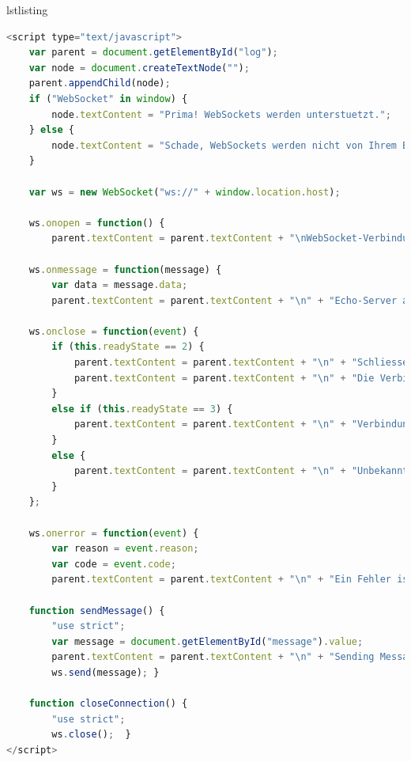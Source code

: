 \documentclass[a4paper, justified, notoc]{tufte-handout} %
\makeatletter
\newenvironment{listing}[1][htbp] %
  {\ifvmode\else\unskip\fi\begin{@tufte@float}[#1]{lstlisting}{}}
  {\end{@tufte@float} } %
\makeatother
\begin{document}
\begin{listing} %
\begin{lstlisting}[language=JavaScript]
<script type="text/javascript">
    var parent = document.getElementById("log");
    var node = document.createTextNode("");
    parent.appendChild(node);
    if ("WebSocket" in window) {
        node.textContent = "Prima! WebSockets werden unterstuetzt.";
    } else {
        node.textContent = "Schade, WebSockets werden nicht von Ihrem Browser unterstuetzt";
    }
    
    var ws = new WebSocket("ws://" + window.location.host);
    
    ws.onopen = function() {
        parent.textContent = parent.textContent + "\nWebSocket-Verbindung aufgebaut mit " + ws.url; };
    
    ws.onmessage = function(message) {
        var data = message.data;
        parent.textContent = parent.textContent + "\n" + "Echo-Server antwortet: " + data.toString(); };
    
    ws.onclose = function(event) {
        if (this.readyState == 2) {
            parent.textContent = parent.textContent + "\n" + "Schliesse Verbindung zum Server...";
            parent.textContent = parent.textContent + "\n" + "Die Verbindung durchlaeuft den Closing Handshake...";
        }
        else if (this.readyState == 3) {
            parent.textContent = parent.textContent + "\n" + "Verbindung geschlossen!";
        }
        else {
            parent.textContent = parent.textContent + "\n" + "Unbekannter ReadyState: " + this.readyState;
        }
    };
    
    ws.onerror = function(event) {
        var reason = event.reason;
        var code = event.code;
        parent.textContent = parent.textContent + "\n" + "Ein Fehler ist aufgetreten: " + reason + " - " + code; }
    
    function sendMessage() {
        "use strict";
        var message = document.getElementById("message").value;
        parent.textContent = parent.textContent + "\n" + "Sending Message to Echo-Server: " + message;
        ws.send(message); }
    
    function closeConnection() {
        "use strict";
        ws.close();  }
</script>
\end{lstlisting}
	\caption{JavaScript part of the WebSocket echo client file \texttt{index.html}}
	\label{echo_client_2}
\end{listing}
\end{document}

